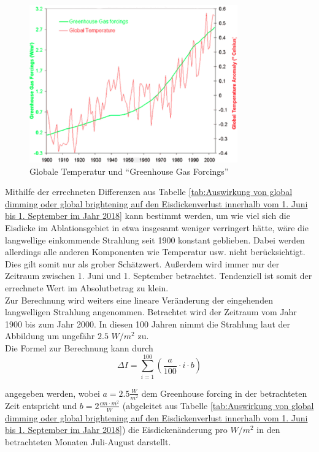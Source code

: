 \documentclass[11pt,a4paper]{article}
\begin{document}
\begin{figure}[H]
\centering
\includegraphics[width=0.8\textwidth]{pictures/greenhouse_gas_forcing.png}
\caption[Globale Temperatur und ``Greenhouse Gas Forcings'']{Globale Temperatur und ``Greenhouse Gas Forcings'' \parencite{GreenhouseGasForcing}}
\label{Globale Temperatur und ``Greenhouse Gas Forcings''}
\end{figure}


Mithilfe der errechneten Differenzen aus Tabelle \ref{tab:Auswirkung von global dimming oder global brightening auf den Eisdickenverlust innerhalb vom 1. Juni bis 1. September im Jahr 2018} kann bestimmt werden, um wie viel sich die Eisdicke im Ablationsgebiet in etwa insgesamt weniger verringert hätte, wäre die langwellige einkommende Strahlung seit 1900 konstant geblieben. Dabei werden allerdings alle anderen Komponenten wie Temperatur usw. nicht berücksichtigt. Dies gilt somit nur als grober Schätzwert. Außerdem wird immer nur der Zeitraum zwischen 1. Juni und 1. September betrachtet. Tendenziell ist somit der errechnete Wert im Absolutbetrag zu klein.\\

Zur Berechnung wird weiters eine lineare Veränderung der eingehenden langwelligen Strahlung angenommen. Betrachtet wird der Zeitraum vom Jahr 1900 bis zum Jahr 2000. In diesen 100 Jahren nimmt die Strahlung laut der Abbildung um ungefähr $2.5$ $W/m^2$ zu.\\

Die Formel zur Berechnung kann durch
\begin{equation}
\Delta I =\sum_{i=1}^{100}\left ( \frac{a}{100}\cdot i \cdot b \right )
\end{equation}

angegeben werden, wobei $a=2.5\frac{W}{m^2}$ dem Greenhouse forcing in der betrachteten Zeit entspricht und $b=2 \frac{cm \cdot m^2}{W}$ (abgeleitet aus Tabelle \ref{tab:Auswirkung von global dimming oder global brightening auf den Eisdickenverlust innerhalb vom 1. Juni bis 1. September im Jahr 2018}) die Eisdickenänderung pro $W/m^2$ in den betrachteten Monaten Juli-August darstellt.\\
\end{document}

